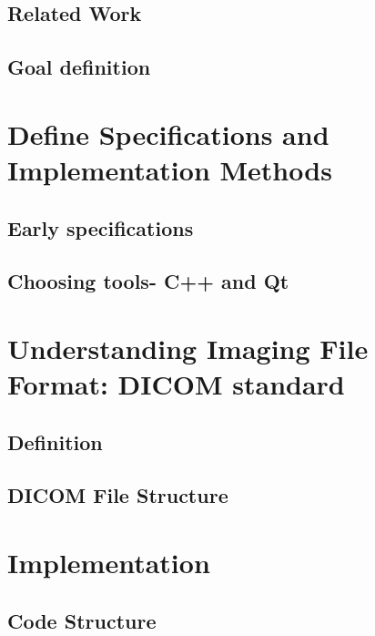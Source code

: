 \documentclass[12pt,twoside]{article}
\begin{document}
\clearpage
\subsection{Related Work}


\clearpage
\subsection{Goal definition}



\clearpage
\section{Define Specifications and Implementation Methods}
\subsection{Early specifications}


\clearpage
\subsection{Choosing tools- C++ and Qt}



\clearpage
\section{Understanding Imaging File Format: DICOM standard }
\subsection{Definition}


\subsection{DICOM File Structure}






\clearpage
\section{Implementation}
\subsection{Code Structure}

\end{document}
